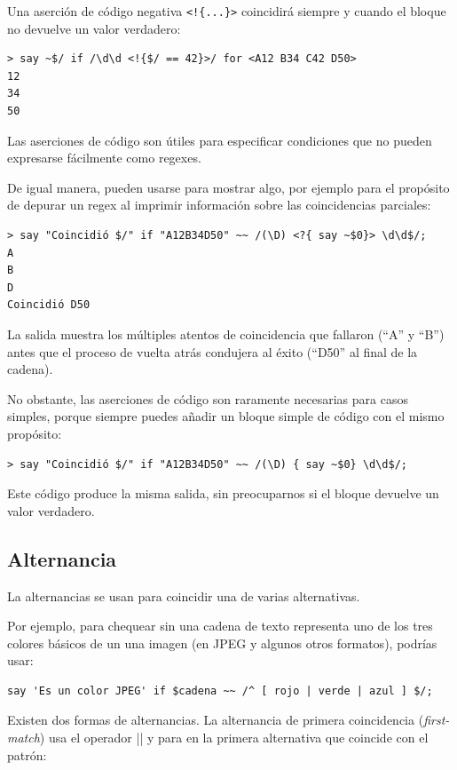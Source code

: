 Una aserción de código negativa \verb|<!{...}>| 
coincidirá siempre y cuando el bloque no devuelve
un valor verdadero:
\begin{lstlisting}
> say ~$/ if /\d\d <!{$/ == 42}>/ for <A12 B34 C42 D50>
12
34
50
\end{lstlisting}

Las aserciones de código son útiles para especificar 
condiciones que no pueden expresarse fácilmente como
regexes.

De igual manera, pueden usarse para mostrar algo, por ejemplo
para el propósito de depurar un regex al imprimir información
sobre las coincidencias parciales:

\begin{lstlisting}
> say "Coincidió $/" if "A12B34D50" ~~ /(\D) <?{ say ~$0}> \d\d$/;
A
B
D
Coincidió D50
\end{lstlisting}

La salida muestra los múltiples atentos de coincidencia
que fallaron (``A'' y ``B'') antes que el proceso de vuelta atrás 
condujera al éxito (``D50'' al final de la cadena).

No obstante, las aserciones de código son raramente necesarias
para casos simples, porque siempre puedes añadir un bloque simple de
código con el mismo propósito:
%
\begin{lstlisting}
> say "Coincidió $/" if "A12B34D50" ~~ /(\D) { say ~$0} \d\d$/;
\end{lstlisting}
Este código produce la misma salida, sin preocuparnos si el 
bloque devuelve un valor verdadero.

\subsection{Alternancia}

La alternancias se usan para coincidir una de varias alternativas.

Por ejemplo, para chequear sin una cadena de texto representa uno 
de los tres colores básicos de un una imagen (en JPEG y algunos otros
formatos), podrías usar:

\begin{lstlisting}
say 'Es un color JPEG' if $cadena ~~ /^ [ rojo | verde | azul ] $/;
\end{lstlisting}
%

Existen dos formas de alternancias. La alternancia de primera
coincidencia (\emph{first-match}) usa el operador \verb|||| y para en la primera
alternativa que coincide con el patrón:

